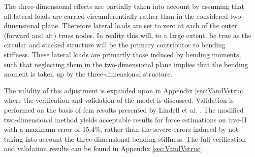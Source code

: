 The three-dimensional effects are partially taken into account by assuming that all lateral loads are carried circumferentially rather than in the considered two-dimensional plane. Therefore lateral loads are set to zero at each of the outer (forward and aft) truss nodes. In reality this will, to a large extent, be true as the circular and stacked structure will be the primary contributor to bending stiffness. These lateral loads are primarily those induced by bending moments, such that neglecting them in the two-dimensional plane implies that the bending moment is taken up by the three-dimensional structure. 

The validity of this adjustment is expanded upon in Appendix \ref{sec:VandVstruc} where the verification and validation of the model is discussed. Validation is performed on the basis of \gls{fem} results presented by Lindell et al. \cite{Lindell2006}. The modified two-dimensional method yields acceptable results for force estimations on \gls{irve}-II with a maximum error of 15.4\%, rather than the severe errors induced by not taking into account the three-dimensional bending stiffness. The full verification and validation results can be found in Appendix \ref{sec:VandVstruc}.

